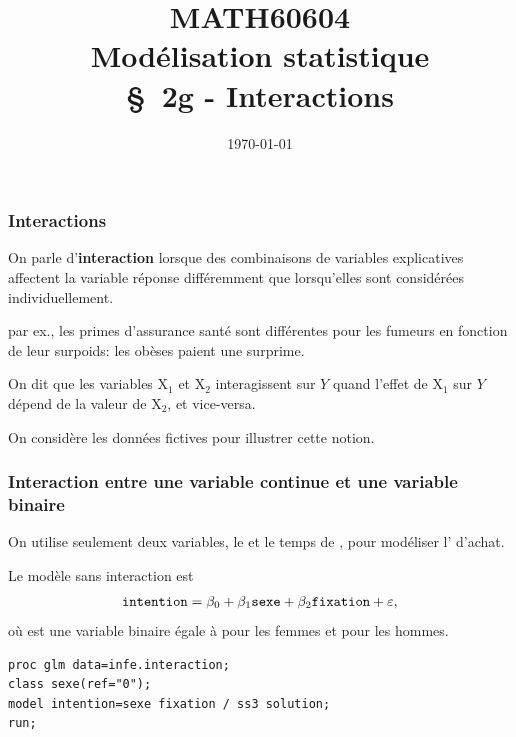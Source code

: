 \documentclass[xcolor={dvipsnames}]{beamer}
\title[\color{white}{MATH60604 \S~2g - Interactions}]{MATH60604 \\Modélisation statistique \\ \S~2g - Interactions}
\author{}
\date{\today}
\institute{HEC Montréal\\
Département de sciences de la décision}
\date{}
\begin{document}
\frame{\titlepage}
\begin{frame}
 \frametitle{Interactions}
 \bi 
 \item On parle d'\textbf{interaction} lorsque des combinaisons de variables explicatives affectent la variable réponse différemment que lorsqu'elles sont considérées individuellement.
 \item par ex., les primes d'assurance santé sont différentes pour les fumeurs en fonction de leur surpoids: les obèses paient une surprime.
\item On dit que les variables $\mathrm{X}_1$ et $\mathrm{X}_2$ interagissent sur $Y$ quand \alert{l'effet de $\mathrm{X}_1$ sur $Y$ dépend de la valeur de $\mathrm{X}_2$, et vice-versa}.
  \item On considère les données fictives  pour illustrer cette notion.
  \ei
 \end{frame}
 
\begin{frame}[fragile]
\frametitle{Interaction entre une variable continue et une variable binaire}
\bi
\item On utilise seulement deux variables, le  et le temps de , pour modéliser l' d'achat. 
\item Le modèle sans interaction est
\begin{align*}
\texttt{intention}=\beta_0 + \beta_1 \texttt{sexe} + \beta_2 \texttt{fixation} + \varepsilon,
\end{align*}
où  est une variable binaire égale à  pour les femmes et  pour les hommes.
\ei
\begin{tcolorbox}[colback=white,colframe=hecblue,title=code \SASlang pour ajuster un modèle linéaire]
\begin{verbatim}
proc glm data=infe.interaction;
class sexe(ref="0");
model intention=sexe fixation / ss3 solution;
run;
\end{verbatim}
\end{tcolorbox}
\end{frame}
\end{document}
